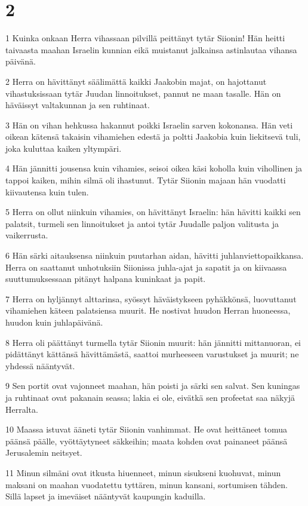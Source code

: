 \chapter{2}

\par 1 Kuinka onkaan Herra vihassaan pilvillä peittänyt tytär Siionin! Hän heitti taivaasta maahan Israelin kunnian eikä muistanut jalkainsa astinlautaa vihansa päivänä.
\par 2 Herra on hävittänyt säälimättä kaikki Jaakobin majat, on hajottanut vihastuksissaan tytär Juudan linnoitukset, pannut ne maan tasalle. Hän on häväissyt valtakunnan ja sen ruhtinaat.
\par 3 Hän on vihan hehkussa hakannut poikki Israelin sarven kokonansa. Hän veti oikean kätensä takaisin vihamiehen edestä ja poltti Jaakobia kuin liekitsevä tuli, joka kuluttaa kaiken yltympäri.
\par 4 Hän jännitti jousensa kuin vihamies, seisoi oikea käsi koholla kuin vihollinen ja tappoi kaiken, mihin silmä oli ihastunut. Tytär Siionin majaan hän vuodatti kiivautensa kuin tulen.
\par 5 Herra on ollut niinkuin vihamies, on hävittänyt Israelin: hän hävitti kaikki sen palatsit, turmeli sen linnoitukset ja antoi tytär Juudalle paljon valitusta ja vaikerrusta.
\par 6 Hän särki aitauksensa niinkuin puutarhan aidan, hävitti juhlanviettopaikkansa. Herra on saattanut unhotuksiin Siionissa juhla-ajat ja sapatit ja on kiivaassa suuttumuksessaan pitänyt halpana kuninkaat ja papit.
\par 7 Herra on hyljännyt alttarinsa, syössyt häväistykseen pyhäkkönsä, luovuttanut vihamiehen käteen palatsiensa muurit. He nostivat huudon Herran huoneessa, huudon kuin juhlapäivänä.
\par 8 Herra oli päättänyt turmella tytär Siionin muurit: hän jännitti mittanuoran, ei pidättänyt kättänsä hävittämästä, saattoi murheeseen varustukset ja muurit; ne yhdessä nääntyvät.
\par 9 Sen portit ovat vajonneet maahan, hän poisti ja särki sen salvat. Sen kuningas ja ruhtinaat ovat pakanain seassa; lakia ei ole, eivätkä sen profeetat saa näkyjä Herralta.
\par 10 Maassa istuvat ääneti tytär Siionin vanhimmat. He ovat heittäneet tomua päänsä päälle, vyöttäytyneet säkkeihin; maata kohden ovat painaneet päänsä Jerusalemin neitsyet.
\par 11 Minun silmäni ovat itkusta hiuenneet, minun sisukseni kuohuvat, minun maksani on maahan vuodatettu tyttären, minun kansani, sortumisen tähden. Sillä lapset ja imeväiset nääntyvät kaupungin kaduilla.
